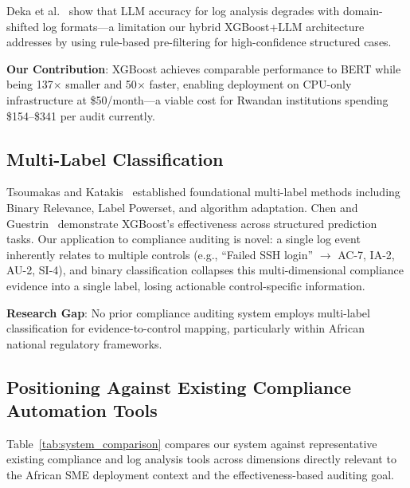 \documentclass[futureinternet,article,submit,pdftex,moreauthors]{Definitions/mdpi}
\begin{document}
Deka et al.~\cite{deka2024} show that LLM accuracy for log analysis degrades with
domain-shifted log formats---a limitation our hybrid XGBoost+LLM architecture addresses by
using rule-based pre-filtering for high-confidence structured cases.

\textbf{Our Contribution}: XGBoost achieves comparable performance to BERT while being
137$\times$ smaller and 50$\times$ faster, enabling deployment on CPU-only infrastructure at
\$50/month---a viable cost for Rwandan institutions spending \$154--\$341 per audit currently.

\subsection{Multi-Label Classification}

Tsoumakas and Katakis~\cite{tsoumakas2007} established foundational multi-label methods
including Binary Relevance, Label Powerset, and algorithm adaptation. Chen and
Guestrin~\cite{chen2016xgboost} demonstrate XGBoost's effectiveness across structured
prediction tasks. Our application to compliance auditing is novel: a single log event
inherently relates to multiple controls (e.g., ``Failed SSH login'' $\rightarrow$ AC-7,
IA-2, AU-2, SI-4), and binary classification collapses this multi-dimensional compliance
evidence into a single label, losing actionable control-specific information.

\textbf{Research Gap}: No prior compliance auditing system employs multi-label classification
for evidence-to-control mapping, particularly within African national regulatory frameworks.

\subsection{Positioning Against Existing Compliance Automation Tools}

Table~\ref{tab:system_comparison} compares our system against representative existing
compliance and log analysis tools across dimensions directly relevant to the African SME
deployment context and the effectiveness-based auditing goal.
\end{document}
